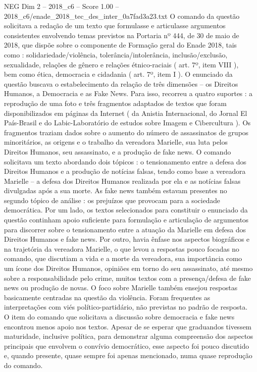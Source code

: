 \begin{textsample}{NEG Dim 2 – 2018\_c6 – Score 1.00 – 2018\_c6/enade\_2018\_tec\_des\_inter\_0a7fad3a23.txt}
O comando da questão solicitava a redação de um texto que formulasse e articulasse argumentos consistentes envolvendo temas previstos na Portaria nº 444, de 30 de maio de 2018, que dispõe sobre o componente de Formação geral do Enade 2018, tais como : solidariedade/violência, tolerância/intolerância, inclusão/exclusão, sexualidade, relações de gênero e relações étnico-raciais ( art. 7º, item VIII ), bem como ética, democracia e cidadania ( art. 7º, item I ).
O enunciado da questão buscava o estabelecimento da relação de três dimensões – os Direitos Humanos, a Democracia e as Fake News.
Para isso, recorreu a quatro suportes : a reprodução de uma foto e três fragmentos adaptados de textos que foram disponibilizados em páginas da Internet ( da Anistia Internacional, do Jornal El País-Brasil e do Labic-Laboratório de estudos sobre Imagem e Cibercultura ).
Os fragmentos traziam dados sobre o aumento do número de assassinatos de grupos minoritários, as origens e o trabalho da vereadora Marielle, sua luta pelos Direitos Humanos, seu assassinato, e a produção de fake news.
O comando solicitava um texto abordando dois tópicos : o tensionamento entre a defesa dos Direitos Humanos e a produção de notícias falsas, tendo como base a vereadora Marielle – a defesa dos Direitos Humanos realizada por ela e as notícias falsas divulgadas após a sua morte.
As fake news também estavam presentes no segundo tópico de análise : os prejuízos que provocam para a sociedade democrática.
Por um lado, os textos selecionados para constituir o enunciado da questão continham apoio suficiente para formulação e articulação de argumentos para discorrer sobre o tensionamento entre a atuação da Marielle em defesa dos Direitos Humanos e fake news.
Por outro, havia ênfase nos aspectos biográficos e na trajetória da vereadora Marielle, o que levou a respostas pouco focadas no comando, que discutiam a vida e a morte da vereadora, sua importância como um ícone dos Direitos Humanos, opiniões em torno do seu assassinato, até mesmo sobre a responsabilidade pelo crime, muitos textos com a presença/defesa de fake news ou produção de novas.
O foco sobre Marielle também ensejou respostas basicamente centradas na questão da violência.
Foram frequentes as interpretações com viés político-partidário, não previstas no padrão de resposta.
O item do comando que solicitava a discussão sobre democracia e fake news encontrou menos apoio nos textos.
Apesar de se esperar que graduandos tivessem maturidade, inclusive política, para demonstrar alguma compreensão dos aspectos principais que envolvem o convívio democrático, esse aspecto foi pouco discutido e, quando presente, quase sempre foi apenas mencionado, numa quase reprodução do comando.

\end{textsample}
